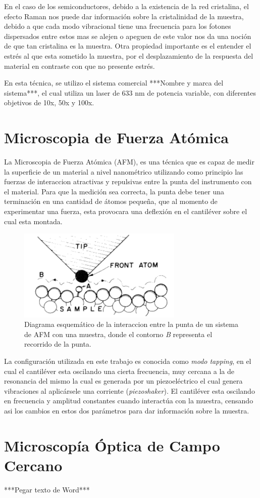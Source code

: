 En el caso de los semiconductores, debido a la existencia de la red cristalina, el efecto Raman nos puede dar información 
sobre la cristalinidad de la muestra, debido a que cada modo vibracional tiene una frecuencia para los fotones dispersados 
entre estos mas se alejen o apeguen de este valor nos da una noción de que tan cristalina es la muestra. Otra propiedad
importante es el entender el estrés al que esta sometido la muestra, por el desplazamiento de la respuesta del material 
en contraste con que no presente estrés.\cite{Weber2000}

En esta técnica, se utilizo el sistema comercial ***Nombre y marca del sistema***, el cual utiliza un laser de 633 nm
de potencia variable, con diferentes objetivos de 10x, 50x y 100x.

\section{Microscopia de Fuerza Atómica}
\label{sec:chap3-afm}
La Microscopia de Fuerza Atómica (AFM), es una técnica que es capaz de medir la superficie de un material a nivel 
nanométrico utilizando como principio las fuerzas de interaccion atractivas y repulsivas entre la punta del instrumento 
con el material. Para que la medición sea correcta, la punta debe tener una terminación en una cantidad de átomos 
pequeña, que al momento de experimentar una fuerza, esta provocara una deflexión en el cantiléver sobre el cual esta 
montada.\cite{Binnig1986}

\begin{figure}[h!]
    \centering
    \includegraphics[width=0.7\textwidth]{figures/chap3/punta.png}
        \caption{Diagrama esquemático de la interaccion entre la punta de un sistema de AFM con una muestra, donde el 
        contorno \textit{B} representa el recorrido de la punta.\cite{Binnig1986}}
    \label{fig:afm_diagram}
\end{figure}

La configuración utilizada en este trabajo es conocida como \textit{modo tapping}, en el cual el cantiléver esta 
oscilando una cierta frecuencia, muy cercana a la de resonancia del mismo la cual es generada por un piezoeléctrico el 
cual genera vibraciones al aplicársele una corriente (\textit{piezoshaker}). El cantiléver esta oscilando en frecuencia 
y amplitud constantes cuando interactúa con la muestra, censando asi los cambios en estos dos parámetros para dar 
información sobre la muestra.\cite{Reifenberger2015-bh}

\section{Microscopía Óptica de Campo Cercano}
\label{sec:chap3-nsom}
***Pegar texto de Word***